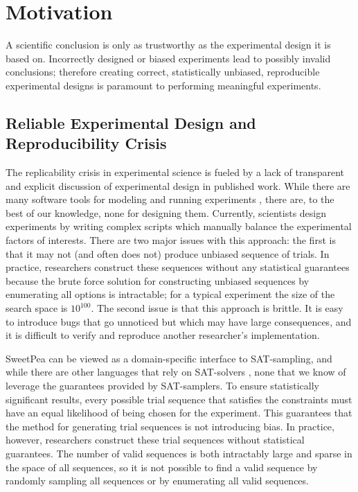 
\chapter{Motivation}

A scientific conclusion is only as trustworthy as the experimental design it is based on. Incorrectly designed or biased experiments lead to possibly invalid conclusions; therefore creating correct, statistically unbiased, reproducible experimental designs is paramount to performing meaningful experiments.

\section{Reliable Experimental Design and Reproducibility Crisis}

The replicability crisis in experimental science is fueled by a lack of transparent and explicit discussion of experimental design in published work. While there are many software tools for modeling and running experiments \cite{cohen1993psyscope} \cite{mathot2012opensesame} \cite{peirce2009generating}, there are, to the best of our knowledge, none for designing them. Currently, scientists design experiments by writing complex scripts which manually balance the experimental factors of interests. There are two major issues with this approach: the first is that it may not (and often does not) produce unbiased sequence of trials. In practice, researchers construct these sequences without any statistical guarantees because the brute force solution for constructing unbiased sequences by enumerating all options is intractable; for a typical experiment the size of the search space is $10^{100}$. The second issue is that this approach is brittle. It is easy to introduce bugs that go unnoticed but which may have large consequences, and it is difficult to verify and reproduce another researcher's implementation.

SweetPea can be viewed as a domain-specific interface to SAT-sampling, and while there are other languages that rely on SAT-solvers \cite{torlak2014lightweight}, none that we know of leverage the guarantees provided by SAT-samplers. To ensure statistically significant results, every possible trial sequence that satisfies the constraints must have an equal likelihood of being chosen for the experiment. This guarantees that the method for generating trial sequences is not introducing bias. In practice, however, researchers construct these trial sequences without statistical guarantees. The number of valid sequences is both intractably large and sparse in the space of all sequences, so it is not possible to find a valid sequence by randomly sampling all sequences or by enumerating all valid sequences.

